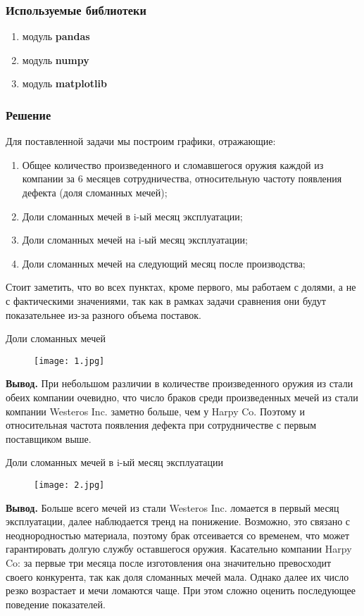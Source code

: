 \documentclass{beamer}
\begin{document}
\begin{frame}\frametitle{Используемые библиотеки}
\begin{enumerate}
\item модуль \textbf{pandas}
\item модуль \textbf{numpy}
\item модуль \textbf{matplotlib}
\end{enumerate}
\end{frame}

\begin{frame}\frametitle{Решение}
Для поставленной задачи мы построим графики, отражающие:
\begin{enumerate}
\item Общее количество произведенного и сломавшегося оружия каждой из компании за 6 месяцев сотрудничества, относительную частоту появления дефекта (доля сломанных мечей);
\item Доли сломанных мечей в i-ый месяц эксплуатации;
\item Доли сломанных мечей на i-ый месяц эксплуатации;
\item Доли сломанных мечей на следующий месяц после производства;
\end{enumerate}
\begin{block}{}
Стоит заметить, что во всех пунктах, кроме первого, мы работаем с долями, а не с фактическими значениями, так как в рамках задачи сравнения они будут показательнее из-за разного объема поставок.
\end{block}
\end{frame}

\begin{frame}{Доли сломанных мечей}
\begin{figure}
\centering
\texttt{[image: 1.jpg]}
\end{figure}
\textbf{Вывод.} При небольшом различии в количестве произведенного оружия из стали обеих компании очевидно, что число браков среди произведенных мечей из стали компании Westeros Inc. заметно больше, чем у Harpy Co. Поэтому и относительная частота появления дефекта при сотрудничестве с первым поставщиком выше.
\end{frame}

\begin{frame}{Доли сломанных мечей в i-ый месяц эксплуатации}
\begin{figure}
\centering
\texttt{[image: 2.jpg]}
\end{figure}
\textbf{Вывод.} Больше всего мечей из стали Westeros Inc. ломается в первый месяц эксплуатации, далее наблюдается тренд на понижение. Возможно, это связано с неоднородностью материала, поэтому брак отсеивается со временем, что может гарантировать долгую службу оставшегося оружия. Касательно компании Harpy Co: за первые три месяца после изготовления она значительно превосходит своего конкурента, так как доля сломанных мечей мала. Однако далее их число резко возрастает и мечи ломаются чаще. При этом сложно оценить последующее поведение показателей.
\end{frame}
\end{document}
